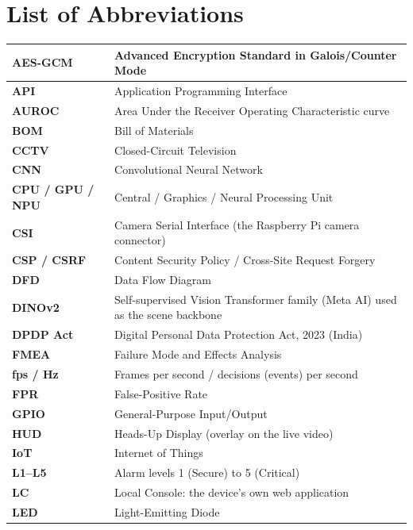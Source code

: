 \chapter*{List of Abbreviations}
\begingroup
\tablefont
\begin{longtable}{@{}L{2.6cm}L{11.6cm}@{}}
\hline
\textbf{AES-GCM} & Advanced Encryption Standard in Galois/Counter Mode\\ \hline
\textbf{API} & Application Programming Interface\\ \hline
\textbf{AUROC} & Area Under the Receiver Operating Characteristic curve\\ \hline
\textbf{BOM} & Bill of Materials\\ \hline
\textbf{CCTV} & Closed-Circuit Television\\ \hline
\textbf{CNN} & Convolutional Neural Network\\ \hline
\textbf{CPU / GPU / NPU} & Central / Graphics / Neural Processing Unit\\ \hline
\textbf{CSI} & Camera Serial Interface (the Raspberry Pi camera connector)\\ \hline
\textbf{CSP / CSRF} & Content Security Policy / Cross-Site Request Forgery\\ \hline
\textbf{DFD} & Data Flow Diagram\\ \hline
\textbf{DINOv2} & Self-supervised Vision Transformer family (Meta AI) used as the scene backbone\\ \hline
\textbf{DPDP Act} & Digital Personal Data Protection Act, 2023 (India)\\ \hline
\textbf{FMEA} & Failure Mode and Effects Analysis\\ \hline
\textbf{fps / Hz} & Frames per second / decisions (events) per second\\ \hline
\textbf{FPR} & False-Positive Rate\\ \hline
\textbf{GPIO} & General-Purpose Input/Output\\ \hline
\textbf{HUD} & Heads-Up Display (overlay on the live video)\\ \hline
\textbf{IoT} & Internet of Things\\ \hline
\textbf{L1--L5} & Alarm levels 1 (Secure) to 5 (Critical)\\ \hline
\textbf{LC} & Local Console: the device's own web application\\ \hline
\textbf{LED} & Light-Emitting Diode\\ \hline

\end{longtable}
